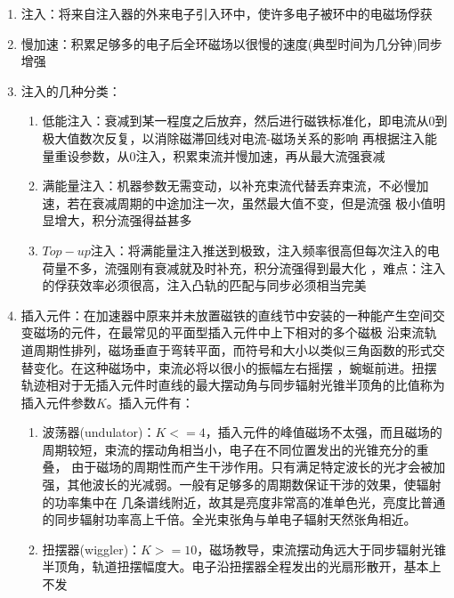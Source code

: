 \documentclass[12pt,a4paper]{article}
\begin{document}
\begin{enumerate}
\begin{enumerate}
                    \item 注入：将来自注入器的外来电子引入环中，使许多电子被环中的电磁场俘获
                    \item 慢加速：积累足够多的电子后全环磁场以很慢的速度(典型时间为几分钟)同步增强
                    \item 注入的几种分类：
                        \begin{enumerate}
                            \item 低能注入：衰减到某一程度之后放弃，然后进行磁铁标准化，即电流从0到极大值数次反复，以消除磁滞回线对电流-磁场关系的影响
                                再根据注入能量重设参数，从0注入，积累束流并慢加速，再从最大流强衰减
                            \item 满能量注入：机器参数无需变动，以补充束流代替丢弃束流，不必慢加速，若在衰减周期的中途加注一次，虽然最大值不变，但是流强
                                极小值明显增大，积分流强得益甚多
                            \item $Top-up$注入：将满能量注入推送到极致，注入频率很高但每次注入的电荷量不多，流强刚有衰减就及时补充，积分流强得到最大化
                                ，难点：注入的俘获效率必须很高，注入凸轨的匹配与同步必须相当完美
                        \end{enumerate}
                    \item 插入元件：在加速器中原来并未放置磁铁的直线节中安装的一种能产生空间交变磁场的元件，在最常见的平面型插入元件中上下相对的多个磁极
                        沿束流轨道周期性排列，磁场垂直于弯转平面，而符号和大小以类似三角函数的形式交替变化。在这种磁场中，束流必将以很小的振幅左右摇摆
                        ，蜿蜒前进。扭摆轨迹相对于无插入元件时直线的最大摆动角与同步辐射光锥半顶角的比值称为插入元件参数$K$。插入元件有：
                        \begin{enumerate}
                            \item 波荡器(undulator)：$K<=4$，插入元件的峰值磁场不太强，而且磁场的周期较短，束流的摆动角相当小，电子在不同位置发出的光锥充分的重叠，
                                由于磁场的周期性而产生干涉作用。只有满足特定波长的光才会被加强，其他波长的光减弱。一般有足够多的周期数保证干涉的效果，使辐射的功率集中在
                                几条谱线附近，故其是亮度非常高的准单色光，亮度比普通的同步辐射功率高上千倍。全光束张角与单电子辐射天然张角相近。
                            \item 扭摆器(wiggler)：$K>=10$，磁场教导，束流摆动角远大于同步辐射光锥半顶角，轨道扭摆幅度大。电子沿扭摆器全程发出的光扇形散开，基本上不发

\end{enumerate}
\end{enumerate}
\end{enumerate}
\end{document}
